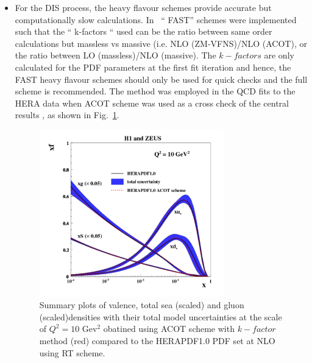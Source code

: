 \begin{description}
\begin{itemize}
\item For the DIS process, the heavy flavour schemes provide accurate but computationally slow calculations. In \fitter~`` FAST'' schemes were implemented 
such that the `` k-factors `` used can be
the ratio between same order calculations but massless vs massive 
(i.e. NLO (ZM-VFNS)/NLO (ACOT), or 
the ratio between LO (massless)/NLO (massive).
The $k-factors$ are only calculated for the PDF parameters at the first 
fit iteration
 and hence, the FAST heavy flavour schemes should only be used 
for quick checks and the full scheme is recommended.
The method was employed in the QCD fits to the HERA data when ACOT scheme was used as a cross check of the central results \cite{h1zeus:2009wt}, as shown in Fig.~\ref{fig:acotrt}.
\begin{figure}[!ht]
   \centering
   \includegraphics[width=8cm]{heraacot.pdf}
   \caption{Summary plots of valence, total sea (scaled) and gluon (scaled)densities with their total model uncertainties at the scale of $Q^2=10$ Gev$^2$ obatined using ACOT scheme with $k-factor$ method (red) compared to the HERAPDF1.0 PDF set at NLO using RT scheme.}
 \label{fig:acotrt}
\end{figure}




\end{itemize}
\end{description}
